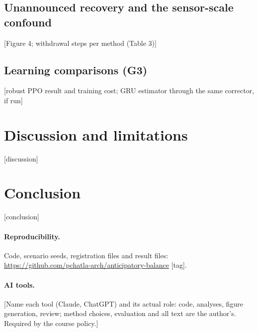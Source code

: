 \documentclass[10pt,twocolumn]{article}
\newcommand{\todo}[1]{\textcolor{red!70!black}{[#1]}}
\begin{document}
\subsection{Unannounced recovery and the sensor-scale confound}
\todo{Figure 4; withdrawal steps per method (Table 3)}

\subsection{Learning comparisons (G3)}
\todo{robust PPO result and training cost; GRU estimator through the same corrector, if run}

\section{Discussion and limitations}
\todo{discussion}

\section{Conclusion}
\todo{conclusion}

\paragraph{Reproducibility.} Code, scenario seeds, registration files and result files:
\url{https://github.com/pchatla-arch/anticipatory-balance} \todo{tag}.

\paragraph{AI tools.} \todo{Name each tool (Claude, ChatGPT) and its actual role: code,
analyses, figure generation, review; method choices, evaluation and all text are the
author's. Required by the course policy.}
\end{document}
